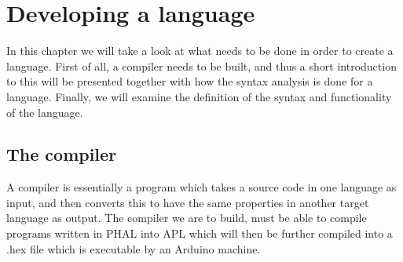 \chapter{Developing a language}\label{ch:TheCompiler}
In this chapter we will take a look at what needs to be done in order to create a language. First of all, a compiler needs to be built, and thus a short introduction to this will be presented together with how the syntax analysis is done for a language. Finally, we will examine the definition of the syntax and functionality of the language. 
\section{The compiler}
A compiler is essentially a program which takes a source code in one language as input, and then converts this to have the same properties in another target language as output. The compiler we are to build, must be able to compile programs written in PHAL into APL which will then be further compiled into a .hex file which is executable by an Arduino machine\cite{ArduinoBuildProcess}.
